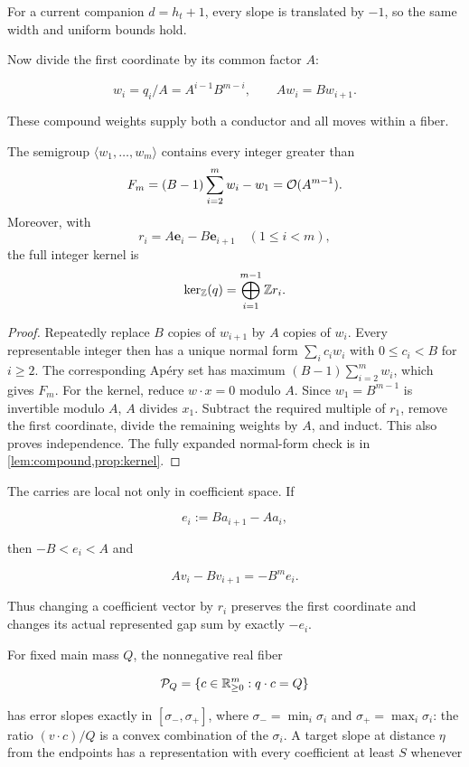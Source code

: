 For a current companion $d=h_t+1$, every slope is translated by $-1$, so the
same width and uniform bounds hold.

Now divide the first coordinate by its common factor $A$:

\[
  w_i=q_i/A=A^{i-1}B^{m-i},
  \qquad Aw_i=Bw_{i+1}.
\]

These compound weights supply both a conductor and all moves within a fiber.

\begin{lemma}
  \label{lem:main-compound}
  The semigroup $\langle w_1,\ldots,w_m\rangle$ contains every integer
  greater than
  \[
    F_m=(B-1)\sum_{i=2}^m w_i-w_1=\mathcal{O}(A^{m-1}).
  \]
  Moreover, with
  \[
    r_i=A\mathbf e_i-B\mathbf e_{i+1}\quad(1\le i<m),
  \]
  the full integer kernel is
  \[
    \ker_{\mathbb{Z}}(q)=\bigoplus_{i=1}^{m-1}\mathbb{Z} r_i.
  \]
\end{lemma}

\begin{proof}
  Repeatedly replace $B$ copies of $w_{i+1}$ by $A$ copies of $w_i$.
  Every representable integer then has a unique normal form
  $\sum_i c_iw_i$ with $0\le c_i<B$ for $i\ge2$.  The corresponding
  Ap\'ery set has maximum $(B-1)\sum_{i=2}^m w_i$, which gives $F_m$.
  For the kernel, reduce $w\cdot x=0$ modulo $A$.  Since $w_1=B^{m-1}$ is
  invertible modulo $A$, $A$ divides $x_1$.  Subtract the required multiple
  of $r_1$, remove the first coordinate, divide the remaining weights by
  $A$, and induct.  This also proves independence.  The fully expanded
  normal-form check is in \cref{lem:compound,prop:kernel}.
\end{proof}

The carries are local not only in coefficient space.  If

\[
  e_i:=Ba_{i+1}-Aa_i,
\]

then $-B<e_i<A$ and

\begin{equation}
  Av_i-Bv_{i+1}=-B^me_i.
  \label{eq:main-carry-error}
\end{equation}

Thus changing a coefficient vector by $r_i$ preserves the first coordinate
and changes its actual represented gap sum by exactly $-e_i$.

For fixed main mass $Q$, the nonnegative real fiber

\[
  \mathcal P_Q=\{c\in\mathbb{R}_{\ge0}^m:q\cdot c=Q\}
\]

has error slopes exactly in
$[\sigma_-,\sigma_+]$, where $\sigma_-=\min_i\sigma_i$ and
$\sigma_+=\max_i\sigma_i$: the ratio $(v\cdot c)/Q$ is a convex
combination of the $\sigma_i$.  A target slope at distance $\eta$ from the
endpoints has a representation with every coefficient at least $S$ whenever

